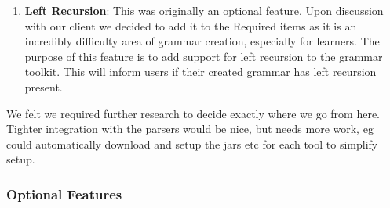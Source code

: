 \begin{enumerate}
	\item \textbf{Left Recursion}:  This was originally an optional feature. Upon discussion with our client we decided to add it to the Required items as it is an incredibly difficulty area of grammar creation, especially for learners. The purpose of this feature is to add support for left recursion to the grammar toolkit. This will inform users if their created grammar has left recursion present. 
\end {enumerate}
We felt we required further research to decide exactly where we go from here. Tighter integration with the parsers would be nice, but needs more work, eg could automatically download and setup the jars etc for each tool to simplify setup.

\subsubsection{Optional Features}
